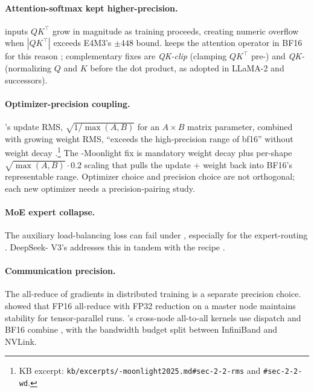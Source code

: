 \paragraph{Attention-softmax kept higher-precision.}  inputs
$QK^\top$ grow in magnitude as training proceeds, creating numeric
overflow when $|QK^\top|$ exceeds E4M3's $\pm 448$ bound. 
keeps the attention operator in BF16 for this reason \citep[\S
3.3.1]{deepseek-v3}; complementary fixes are \emph{QK-clip} (clamping
$QK^\top$ pre-) and \emph{QK-} (normalizing $Q$ and
$K$ before the dot product, as adopted in LLaMA-2 and successors).

\paragraph{Optimizer-precision coupling.} 's update RMS,
$\sqrt{1/\max(A, B)}$ for an $A\times B$ matrix parameter, combined
with growing weight RMS, ``exceeds the high-precision range of
bf16'' without weight decay \citep[\S 2.2]{muon-moonlight2025}.\footnote{KB
excerpt: \texttt{kb/excerpts/-moonlight2025.md\#sec-2-2-rms} and
\texttt{\#sec-2-2-wd}.} The -Moonlight fix is mandatory weight
decay plus per-shape $\sqrt{\max(A, B)} \cdot 0.2$ scaling that pulls
the update + weight back into BF16's representable range. Optimizer
choice and precision choice are not orthogonal; each new optimizer
needs a precision-pairing study.

\paragraph{MoE expert collapse.} The auxiliary load-balancing loss can
fail under , especially for the expert-routing . DeepSeek-
V3's  addresses this in tandem with
the  recipe \citep[abstract]{deepseek-v3}.

\paragraph{Communication precision.} The all-reduce of gradients in
distributed training is a separate precision choice.
\citet{shoeybi2019-megatron} showed that FP16 all-reduce with FP32
reduction on a master node maintains stability for tensor-parallel
runs. 's cross-node all-to-all kernels use  dispatch and
BF16 combine \citep[\S 3.2.2]{deepseek-v3}, with the bandwidth budget
split between InfiniBand and NVLink.

